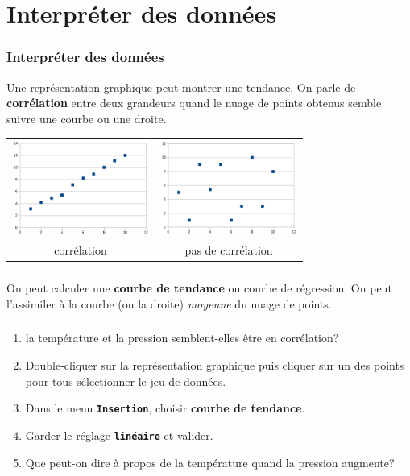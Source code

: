\documentclass[svgnames,11pt]{beamer}
\begin{document}
\section{Interpréter des données}   
\begin{frame}
    \frametitle{Interpréter des données}

\begin{aretenir}[]
    Une représentation graphique peut montrer une tendance. On parle de \textbf{corrélation} entre deux grandeurs quand le nuage de points obtenus semble suivre une courbe ou une droite.
\end{aretenir}
\vspace{1cm}
\begin{tabular}{cc}
    \includegraphics[width=4.5cm]{ressources/correlation.png}
    &
    \includegraphics[width=4.5cm]{ressources/pas-cor.png}\\
    corrélation&pas de corrélation
\end{tabular}   

\end{frame}
\begin{frame}
    \frametitle{}

    \begin{aretenir}[]
    On peut calculer une \textbf{courbe de tendance} ou courbe de régression. On peut l'assimiler à la courbe (ou la droite) \emph{moyenne} du nuage de points.
    \end{aretenir}

\end{frame}
\begin{frame}
    \frametitle{}

    \begin{activite}
    \begin{enumerate}
        \item la température et la pression semblent-elles être en corrélation?
        \item Double-cliquer sur la représentation graphique puis cliquer sur un des points pour tous sélectionner le jeu de données.
        \item Dans le menu \textbf{\texttt{Insertion}}, choisir \textbf{courbe de tendance}.
        \item Garder le réglage \textbf{\texttt{linéaire}} et valider.
        \item Que peut-on dire à propos de la température quand la pression augmente?
    \end{enumerate}
    \end{activite}

\end{frame}
\end{document}
